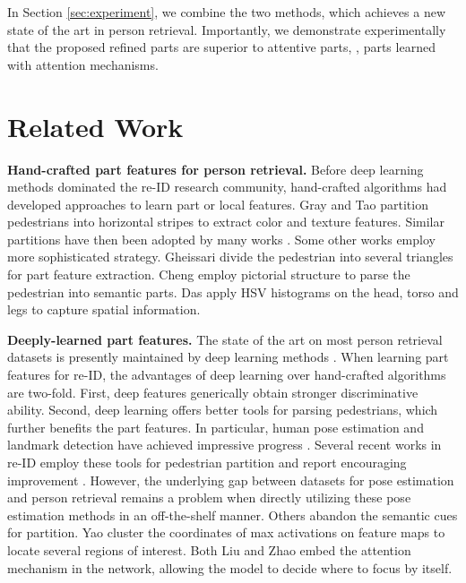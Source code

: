 \documentclass[10pt,twocolumn,letterpaper]{article}
\begin{document}
In Section \ref{sec:experiment}, we combine the two methods, which achieves a new state of the art in person retrieval. Importantly, we demonstrate experimentally that the proposed refined parts are superior to attentive parts, \ie, parts learned with attention mechanisms.  

\section{Related Work}\label{sec:related}

\textbf{Hand-crafted part features for person retrieval.} Before deep learning methods dominated the re-ID research community, hand-crafted algorithms had developed approaches to learn part or local features. Gray and Tao \cite{Gray2008Viewpoint} partition pedestrians into horizontal stripes to extract color and texture features. Similar partitions have then been adopted by many works \cite{Engel2010Person,DBLP:journals/pami/ZhengGX13,Ma2014Domain,DBLP:conf/cvpr/LiaoHZL15}. Some other works employ more sophisticated strategy. Gheissari \etal \cite{Gheissari2006Person} divide the pedestrian into several triangles for part feature extraction. Cheng \etal \cite{cheng2011custom} employ pictorial structure to parse the pedestrian into semantic parts. Das \etal \cite{Das2014Consistent} apply HSV histograms on the head, torso and legs to capture spatial information.  

\textbf{Deeply-learned part features.} 
The state of the art on most person retrieval datasets is presently maintained by deep learning methods \cite{DBLP:journals/corr/ZhengYH16}. When learning part features for re-ID, the advantages of deep learning over hand-crafted algorithms are two-fold. First, deep features generically obtain stronger discriminative ability. Second, deep learning offers better tools for parsing pedestrians, which further benefits the part features. In particular, human pose estimation and landmark detection have achieved impressive progress \cite{pose:Long2015Fully,pose:hourglass,pose:Cao2016Realtime,pose:CPM,pose:DeeperCut}. Several recent works in re-ID employ these tools for pedestrian partition and report encouraging improvement \cite{DBLP:journals/corr/ZhengHLY17,Su2017Pose,Wei2017GLAD}. However, the underlying gap between datasets for pose estimation and person retrieval remains a problem when directly utilizing these pose estimation methods in an off-the-shelf manner. Others abandon the semantic cues for partition. Yao \etal \cite{Yao2017Deep} cluster the coordinates of max activations on feature maps to locate several regions of interest. Both Liu \etal \cite{Liu2017HydraPlus} and Zhao \etal \cite{Zhao2017Deeply} embed the attention mechanism \cite{Xu2015attention_mechanism} in the network, allowing the model to decide where to focus by itself.
\end{document}
